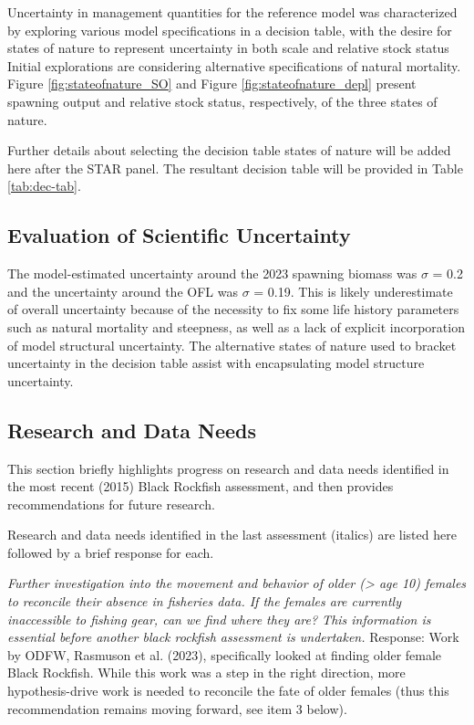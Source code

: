 \documentclass[11pt,
  english,
  letterpaper,
]{article}
\begin{document}
Uncertainty in management quantities for the reference model was characterized by exploring various model specifications in a decision table, with the desire for states of nature to represent uncertainty in both scale and relative stock status Initial explorations are considering alternative specifications of natural mortality. Figure \ref{fig:stateofnature_SO} and Figure \ref{fig:stateofnature_depl} present spawning output and relative stock status, respectively, of the three states of nature.

Further details about selecting the decision table states of nature will be added here after the STAR panel. The resultant decision table will be provided in Table \ref{tab:dec-tab}.

\hypertarget{evaluation-of-scientific-uncertainty}{%
\subsection{Evaluation of Scientific Uncertainty}\label{evaluation-of-scientific-uncertainty}}

The model-estimated uncertainty around the 2023 spawning biomass was \(\sigma\) = 0.2 and the uncertainty around the OFL was \(\sigma\) = 0.19. This is likely underestimate of overall uncertainty because of the necessity to fix some life history parameters such as natural mortality and steepness, as well as a lack of explicit incorporation of model structural uncertainty. The alternative states of nature used to bracket uncertainty in the decision table assist with encapsulating model structure uncertainty.

\hypertarget{research-and-data-needs-1}{%
\subsection{Research and Data Needs}\label{research-and-data-needs-1}}

This section briefly highlights progress on research and data needs identified in the most recent (2015) Black Rockfish assessment, and then provides recommendations for future research.

Research and data needs identified in the last assessment (italics) are listed here followed by a brief response for each.

\textit{Further investigation into the movement and behavior of older (> age 10) females to reconcile their absence in fisheries data. If the females are currently inaccessible to fishing gear, can we find where they are? This information is essential before another black rockfish assessment is undertaken.} Response: Work by ODFW, Rasmuson et al. (2023), specifically looked at finding older female Black Rockfish. While this work was a step in the right direction, more hypothesis-drive work is needed to reconcile the fate of older females (thus this recommendation remains moving forward, see item 3 below).
\end{document}
